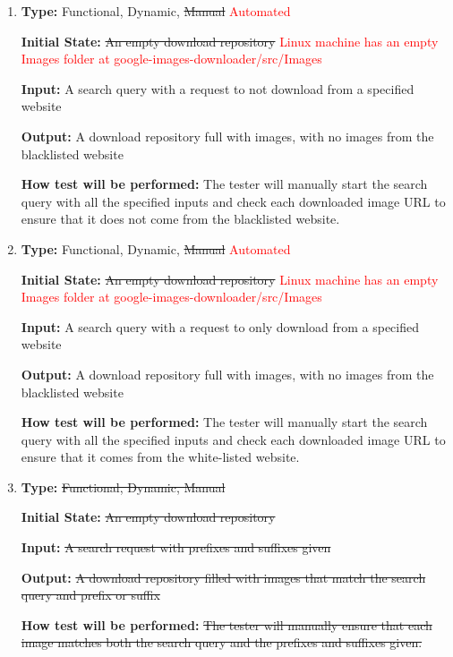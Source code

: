 \documentclass[12pt, titlepage]{article}
\begin{document}
\begin{enumerate}[label=FR-SQ\arabic*:, wide=0pt, leftmargin=*]
\item \phantom{empty}

\textbf{Type:} Functional, Dynamic, \sout{Manual} \textcolor{red}{Automated}
					
\textbf{Initial State:} \sout{An empty download repository}
\textcolor{red}{Linux machine has an empty Images folder at google-images-downloader/src/Images}
					
\textbf{Input:} A search query with a request to not download from a specified website
					
\textbf{Output:} A download repository full with images, with no images from the blacklisted website
					
\textbf{How test will be performed:} The tester will manually start the search query with all the specified inputs and check each downloaded image URL to ensure that it does not come from the blacklisted website.

\item \phantom{empty}

\textbf{Type:} Functional, Dynamic, \sout{Manual} \textcolor{red}{Automated}
					
\textbf{Initial State:} \sout{An empty download repository}
\textcolor{red}{Linux machine has an empty Images folder at google-images-downloader/src/Images}
					
\textbf{Input:} A search query with a request to only download from a specified website
					
\textbf{Output:} A download repository full with images, with no images from the blacklisted website
					
\textbf{How test will be performed:} The tester will manually start the search query with all the specified inputs and check each downloaded image URL to ensure that it comes from the white-listed website.

\item \phantom{empty}

\textbf{Type:} \sout{Functional, Dynamic, Manual}
					
\textbf{Initial State:} \sout{An empty download repository}
					
\textbf{Input:} \sout{A search request with prefixes and suffixes given}
					
\textbf{Output:} \sout{A download repository filled with images that match the search query and prefix or suffix}
					
\textbf{How test will be performed:} \sout{The tester will manually ensure that each image matches both the search query and the prefixes and suffixes given.}


\end{enumerate}
\end{document}
